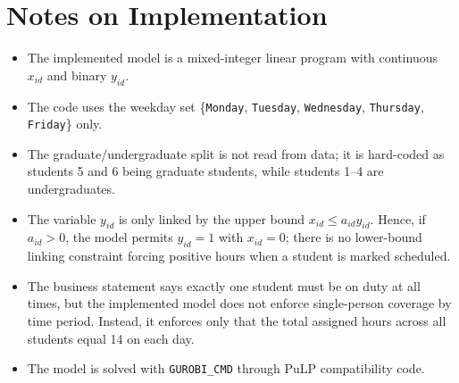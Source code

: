 \section*{Notes on Implementation}

\begin{itemize}
    \item The implemented model is a mixed-integer linear program with continuous $x_{id}$ and binary $y_{id}$.
    \item The code uses the weekday set \{\texttt{Monday}, \texttt{Tuesday}, \texttt{Wednesday}, \texttt{Thursday}, \texttt{Friday}\} only.
    \item The graduate/undergraduate split is not read from data; it is hard-coded as students 5 and 6 being graduate students, while students 1--4 are undergraduates.
    \item The variable $y_{id}$ is only linked by the upper bound $x_{id}\le a_{id}y_{id}$. Hence, if $a_{id}>0$, the model permits $y_{id}=1$ with $x_{id}=0$; there is no lower-bound linking constraint forcing positive hours when a student is marked scheduled.
    \item The business statement says exactly one student must be on duty at all times, but the implemented model does not enforce single-person coverage by time period. Instead, it enforces only that the total assigned hours across all students equal 14 on each day.
    \item The model is solved with \texttt{GUROBI\_CMD} through PuLP compatibility code.
\end{itemize}
